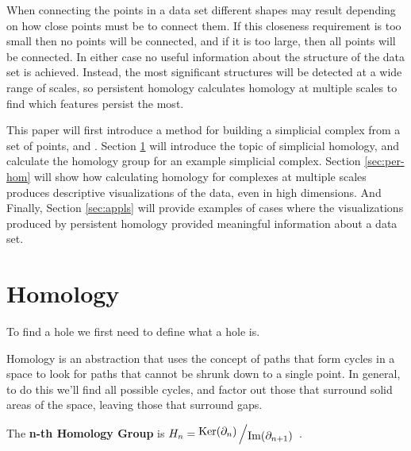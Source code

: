 When connecting the points in a data set different shapes may result depending on how close points must be to connect them.
If this closeness requirement is too small then no points will be connected, and if it is too large, then all points will be connected.
In either case no useful information about the structure of the data set is achieved.
Instead, the most significant structures will be detected at a wide range of scales, so persistent homology calculates homology at multiple scales to find which features persist the most.

This paper will first introduce a method for building a simplicial complex from a set of points, and .
Section \ref{sec:homology} will introduce the topic of simplicial homology, and calculate the homology group for an example simplicial complex.
Section \ref{sec:per-hom} will show how calculating homology for complexes at multiple scales produces descriptive visualizations of the data, even in high dimensions.
And Finally, Section \ref{sec:appls} will provide examples of cases where the visualizations produced by persistent homology provided meaningful information about a data set.


%     


\section{Homology}\label{sec:homology}

To find a hole we first need to define what a hole is.

Homology is an abstraction that uses the concept of paths that form cycles in a space to look for paths that cannot be shrunk down to a single point.
In general, to do this we'll find all possible cycles, and factor out those that surround solid areas of the space, leaving those that surround gaps.

\begin{definition}
    The \textbf{n-th Homology Group} is \(H_n = \bigslant{\Ker(\partial_n)}{\Ima(\partial_{n+1})}\)
    \cite{fraleigha}.
\end{definition}

